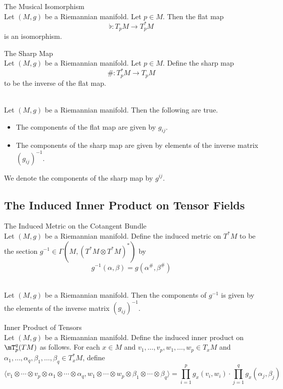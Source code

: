 \documentclass[a4paper]{article}
\begin{document}
\begin{thm}{The Musical Isomorphism}{}\\
Let $(M,g)$ be a Riemannian manifold. Let $p\in M$. Then the flat map $$\flat:T_pM\to T_p^\ast M$$ is an isomorphism. 
\end{thm}

\begin{defn}{The Sharp Map}{}\\
Let $(M,g)$ be a Riemannian manifold. Let $p\in M$. Define the sharp map $$\#:T_p^\ast M\to T_pM$$ to be the inverse of the flat map. 
\end{defn}

\begin{prp}{}{}\\
Let $(M,g)$ be a Riemannian manifold. Then the following are true. 
\begin{itemize}
\item The components of the flat map are given by $g_{ij}$. 
\item The components of the sharp map are given by elements of the inverse matrix $(g_{ij})^{-1}$. 
\end{itemize}
\end{prp}

We denote the components of the sharp map by $g^{ij}$. 

\subsection{The Induced Inner Product on Tensor Fields}
\begin{defn}{The Induced Metric on the Cotangent Bundle}{}\\
Let $(M,g)$ be a Riemannian manifold. Define the induced metric on $T^\ast M$ to be the section $g^{-1}\in\Gamma(M,(T^\ast M\otimes T^\ast M)^\ast)$ by $$g^{-1}(\alpha,\beta)=g(\alpha^\#,\beta^\#)$$
\end{defn}

\begin{prp}{}{}\\
Let $(M,g)$ be a Riemannian manifold. Then the components of $g^{-1}$ is given by the elements of the inverse matrix $(g_{ij})^{-1}$. 
\end{prp}

\begin{defn}{Inner Product of Tensors}{}\\
Let $(M,g)$ be a Riemannian manifold. Define the induced inner product on $\mT_p^q(TM)$ as follows. For each $x\in M$ and $v_1,\dots,v_p,w_1,\dots,w_p\in T_xM$ and $\alpha_1,\dots,\alpha_q,\beta_1,\dots,\beta_q\in T_x^\ast M$, define $$\langle v_1\otimes\cdots\otimes v_p\otimes\alpha_1\otimes\cdots\otimes\alpha_q,w_1\otimes\cdots\otimes w_p\otimes\beta_1\otimes\cdots\otimes\beta_q\rangle=\prod_{i=1}^pg_x(v_i,w_i)\cdot\prod_{j=1}^qg_x(\alpha_j,\beta_j)$$
\end{defn}
\end{document}
